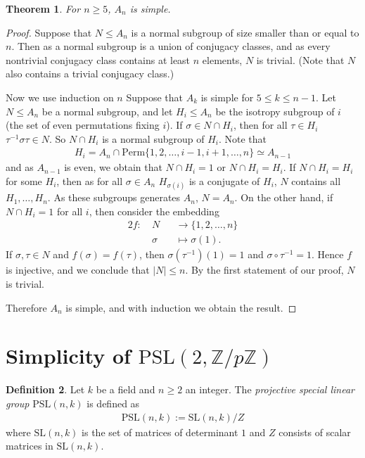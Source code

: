\documentclass[12pt]{report}
\theoremstyle{plain}
\newtheorem{theorem}{Theorem}[section]
\theoremstyle{remark}
\theoremstyle{definition}
\newtheorem{definition}[theorem]{Definition}
\newcommand{\Z}{\mathbb{Z}}
\begin{document}
\begin{theorem}
    For $n\ge 5$, $A_n$ is simple.
\end{theorem}
\begin{proof}
    Suppose that $N\le A_n$ is a normal subgroup of size smaller than or equal to $n$. Then as a normal subgroup is a union of conjugacy classes, and as every nontrivial conjugacy class contains at least $n$ elements, $N$ is trivial. (Note that $N$ also contains a trivial conjugacy class.)

    Now we use induction on $n$ Suppose that $A_k$ is simple for $5\le k\le n-1$. Let $N\le A_n$ be a normal subgroup, and let $H_i\le A_n$ be the isotropy subgroup of $i$ (the set of even permutations fixing $i$). If $\sigma\in N\cap H_i$, then for all $\tau\in H_i$ $\tau^{-1}\sigma\tau\in N$. So $N\cap H_i$ is a normal subgroup of $H_i$. Note that
    \begin{align*}
        H_i=A_n\cap \mathrm{Perm}\{1,2,\dots,i-1,i+1,\dots,n\}\simeq A_{n-1}
    \end{align*}
    and as $A_{n-1}$ is even, we obtain that $N\cap H_i=1$ or $N\cap H_i=H_i$. If $N\cap H_i=H_i$ for some $H_i$, then as for all $\sigma\in A_n$ $H_{\sigma(i)}$ is a conjugate of $H_i$, $N$ contains all $H_1,\dots,H_n$. As these subgroups generates $A_n$, $N=A_n$. On the other hand, if $N\cap H_i=1$ for all $i$, then consider the embedding
    \begin{alignat*}{2}
        f:\ &N &&\rightarrow \{1,2,\dots,n\} \\
        &\sigma &&\mapsto \sigma(1).
    \end{alignat*}
    If $\sigma,\tau\in N$ and $f(\sigma)=f(\tau)$, then $\sigma(\tau^{-1})(1)=1$ and $\sigma\circ \tau^{-1}=1$. Hence $f$ is injective, and we conclude that $|N|\le n$. By the first statement of our proof, $N$ is trivial.

    Therefore $A_n$ is simple, and with induction we obtain the result.
\end{proof}


\section{\texorpdfstring{Simplicity of $\mathrm{PSL}(2,\Z/p\Z)$}{Simplicity of PSL(2)}}
\begin{definition}
    Let $k$ be a field and $n\ge 2$ an integer. The \emph{projective special linear group} $\mathrm{PSL}(n,k)$ is defined as
    \begin{align*}
        \mathrm{PSL}(n,k):=\mathrm{SL}(n,k)/Z
    \end{align*}
    where $\mathrm{SL}(n,k)$ is the set of matrices of determinant $1$ and $Z$ consists of scalar matrices in $\mathrm{SL}(n,k)$.
\end{definition}
\end{document}

